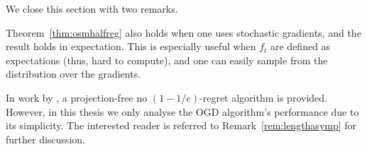 We close this section with two remarks.
\begin{remark}
    Theorem~\ref{thm:osmhalfreg} also holds when one uses stochastic gradients, and the result holds in expectation. This is especially useful when $f_t$ are defined as expectations (thus, hard to compute), and one can easily sample from the distribution over the gradients. 
\end{remark}
\begin{remark}
    In work by \citep{chen2018projection}, a projection-free no $(1-1/e)$-regret algorithm is provided. However, in this thesis we only analyse the OGD algorithm's performance due to its simplicity. The interested reader is referred to Remark~\ref{rem:lengthasymp} for further discussion.
\end{remark}
 
